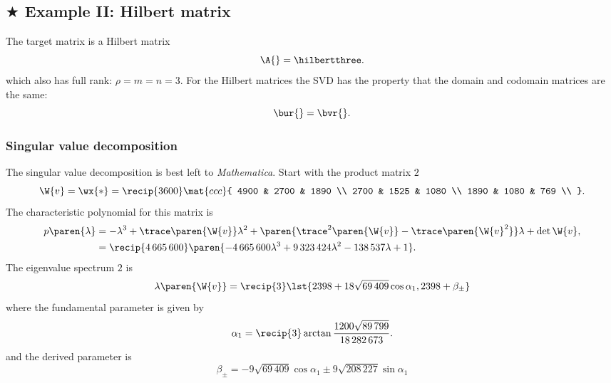 \subsection[Example II: Hilbert matrix]{$\bigstar$ Example II: Hilbert matrix}
\label{sec:vis:2d:II}
The target matrix is a Hilbert matrix
\begin{equation}
  \A{} = \hilbertthree.
\end{equation}
which also has full rank: $\rho = m = n = 3$. For the Hilbert matrices the SVD has the property that the domain and codomain matrices are the same:
\begin{equation}
  \bur{} = \bvr{}.
\end{equation}

\subsubsection{Singular value decomposition}
The singular value decomposition is best left to \emph{Mathematica}.
Start with the product matrix $\boxed{2}$ 
%
\begin{equation}
  \W{v} = \wx{*} = \recip{3600} \mat{ccc}{
    4900 & 2700 & 1890 \\
    2700 & 1525 & 1080 \\
    1890 & 1080 & 769 \\
  }  .
\end{equation}
%
The characteristic polynomial for this matrix is
\begin{equation}
  \begin{split}
     p\paren{\lambda} 
       &= -\lambda^{3} + \trace\paren{\W{v}} \lambda^{2} + \paren{\trace^{2}\paren{\W{v}}-\trace\paren{\W{v}^{2}}} \lambda + \det{\W{v}}, \\
       &= \recip{4\,665\,600} \paren{ - 4\,665\,600\lambda^{3} + 9\,323\,424 \lambda^{2} - 138\,537 \lambda + 1} .
  \end{split}
\end{equation}
%
The eigenvalue spectrum $\boxed{2}$ is
%
\begin{equation}
  \lambda \paren{ \W{v} } = \recip{3}
  \lst{2398 + 18 \sqrt{69\,409} \cos \alpha_{1}, 2398 + \beta_{\pm}}
\end{equation}
%
where the fundamental parameter is given by
%
\begin{equation}
  \alpha_{1} = \recip{3} \arctan \frac{1200 \sqrt{89\,799}} {18\,282\,673}.
\end{equation}
%
and the derived parameter is
%
\begin{equation}
  \beta_{\pm} = - 9 \sqrt{69\,409} \cos \alpha_{1} \pm 9 \sqrt{208\,227} \sin \alpha_{1}
\end{equation}

